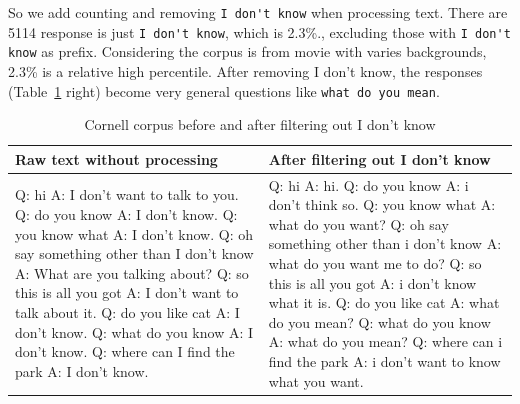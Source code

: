 \documentclass{article}
\begin{document}
So we add counting and removing \verb+I don't know+ when processing text.
There are 5114 response is just \verb+I don't know+, which is 2.3\%., excluding those with \verb+I don't know+ as prefix.
Considering the corpus is from movie with varies backgrounds, 2.3\% is a relative high percentile.
After removing I don't know, the responses (Table~\ref{table:cornell-idk} right) become very general questions like \verb+what do you mean+.

\begin{table}[h]
    \caption{Cornell corpus before and after filtering out I don't know}
    \label{table:cornell-idk}
    \centering
\begin{tabular}{p{70mm}|p{70mm}}
  \toprule
  Raw text without processing & After filtering out I don't know \\
  \hline
  Q: hi \newline
A: I don't want to talk to you. \newline
Q: do you know \newline
A: I don't know. \newline
Q: you know what \newline
A: I don't know. \newline
Q: oh say something other than I don't know \newline
A: What are you talking about? \newline
Q: so this is all you got \newline
A: I don't want to talk about it. \newline
Q: do you like cat \newline
A: I don't know. \newline
Q: what do you know \newline
A: I don't know. \newline
Q: where can I find the park \newline
A: I don't know.
  &
Q: hi \newline
A: hi. \newline
Q: do you know \newline
A: i don't think so. \newline
Q: you know what \newline
A: what do you want? \newline
Q: oh say something other than i don't know \newline
A: what do you want me to do? \newline
Q: so this is all you got \newline
A: i don't know what it is. \newline
Q: do you like cat \newline
A: what do you mean? \newline
Q: what do you know \newline
A: what do you mean? \newline
Q: where can i find the park \newline
A: i don't want to know what you want.
  \\
  \bottomrule
\end{tabular}
\end{table}
\end{document}
